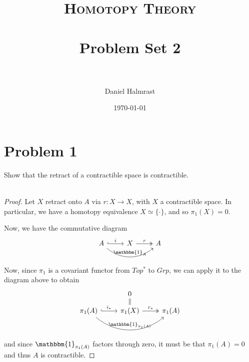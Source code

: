 \documentclass[fontsize=11pt]{scrartcl} %
\title{	
\normalfont \normalsize 
\textsc{Homotopy Theory} \\ [25pt] %
\horrule{0.5pt} \\[0.4cm] %
\huge Problem Set 2 \\ %
\horrule{2pt} \\[0.5cm] %
}
\author{Daniel Halmrast} %
\date{\normalsize\today} %
\numberwithin{equation}{section} %
\numberwithin{figure}{section} %
\numberwithin{table}{section} %
\begin{document}
\maketitle %

\section*{Problem 1} %
Show that the retract of a contractible space is contractible.
\\
\\
\begin{proof}
    Let $X$ retract onto $A$ via $r:X\to X$, with $X$ a contractible space.
    In particular, we have a homotopy equivalence $X\simeq \{\cdot\}$, and so
    $\pi_1(X) = 0$.

    Now, we have the commutative diagram
    \[
        \begin{tikzcd}
            A\arrow[hook]{r}{i}\arrow[bend right=40]{rr}{\mathbbm{1}_A} &X\arrow[two heads]{r}{r} &A\\
        \end{tikzcd}
    \]
    Now, since $\pi_1$ is a covariant functor from $Top^*$ to $Grp$, we can
    apply it to the diagram above to obtain
    \[
        \begin{tikzcd}[row sep=small]
             & 0 & \\
            \pi_1(A)\arrow[hook]{r}{i_*}\arrow[bend right=40]{rr}{\mathbbm{1}_{\pi_1(A)}} 
            &\pi_1(X)\arrow[two heads]{r}{r_*} \arrow[equal]{u}
            &\pi_1(A)\\
        \end{tikzcd}
    \]
    and since $\mathbbm{1}_{\pi_1(A)}$ factors through zero, it must be that
    $\pi_1(A) = 0$ and thus $A$ is contractible.
\end{proof}
\end{document}

